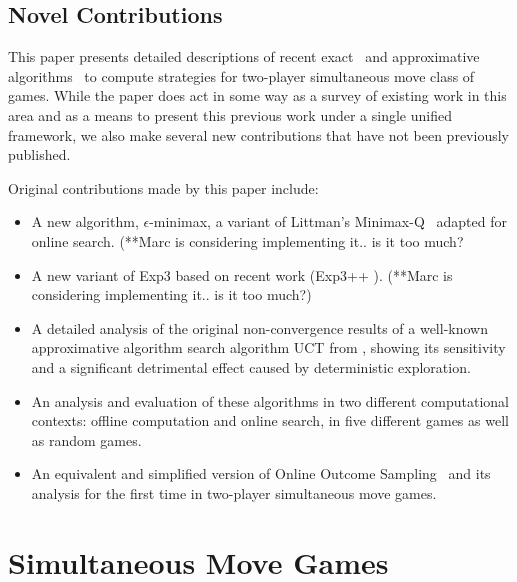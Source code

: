 \documentclass[preprint,12pt]{elsarticle}
\newcommand{\reviewchange}[1]{{\color{blue}#1}}
\begin{document}
\reviewchange{
\subsection{Novel Contributions}
\label{sec:contrib}

This paper presents detailed descriptions of recent exact~\cite{Bosansky13Using} and approximative
algorithms~\cite{Lanctot13Goofspiel,lisy2013-nips} to compute strategies for two-player simultaneous move class of games.
While the paper does act in some way as a survey of existing work in this area and as a means to present this previous work under a single unified framework, we also make several new contributions that have not been previously published.

Original contributions made by this paper include:

\begin{itemize}
\item A new algorithm, $\epsilon$-minimax, a variant of Littman's Minimax-Q~\cite{Littman94markovgames} adapted for online search. (**Marc is considering implementing it.. is it too much?
\item A new variant of Exp3 based on recent work (Exp3++ \cite{2014}). (**Marc is considering implementing it.. is it too much?)
\item A detailed analysis of the original non-convergence results of a well-known approximative algorithm search algorithm UCT from \cite{Shafiei09}, showing its sensitivity and a significant detrimental effect caused by deterministic exploration.
\item An analysis and evaluation of these algorithms in two different computational contexts: offline computation and online search, in five different games as well as random games.
\item An equivalent and simplified version of Online Outcome Sampling~\cite{15aamas-iioos} and its analysis for the first time in two-player simultaneous move games.
\end{itemize}

}

\section{Simultaneous Move Games}  \label{sec:smg}
\end{document}
